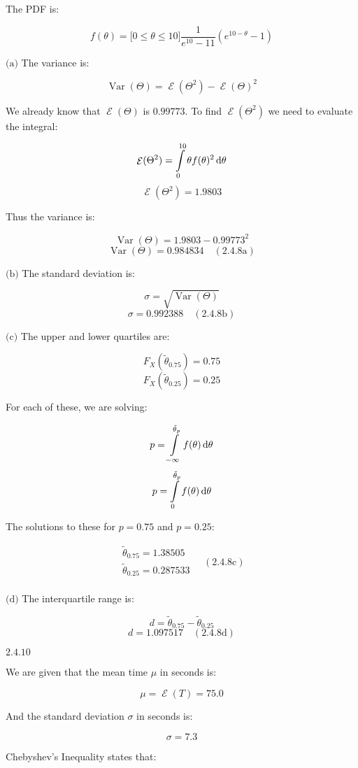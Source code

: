 \documentclass{article}
\newcommand{\problem}[2]{$\boxed{\text{#1.#2}}$}
\newcommand{\subproblem}[3]{$\boxed{\text{(#3)}}$}
\newcommand{\subsolution}[4]{\boxed{#4\quad(\text{#1.#2#3})}}
\renewcommand{\d}[1]{\,\textnormal{d}#1}
\DeclareMathOperator{\var}{Var}
\DeclareMathOperator{\E}{\mathcal{E}}
\begin{document}
The PDF is:

\[
f(\theta)=\lbrack0\le\theta\le10\rbrack \frac{1}{e^{10}-11}\left(e^{10-\theta}-1\right)
\]

%
\subproblem{2.4}{8}{a} The variance is:

\[
\var(\Theta)=\E(\Theta^2)-\E(\Theta)^2
\]

We already know that $\E(\Theta)$ is $0.99773$. To find $\E(\Theta^2)$
we need to evaluate the integral:

\[
\E(\Theta^2)=\int\limits_{0}^{10} \theta f(\theta)^2 \d{\theta}
\] \[
\E(\Theta^2)=1.9803
\]

Thus the variance is:

\[
\var(\Theta)=1.9803-0.99773^2
\] \[
\subsolution{2.4}{8}{a}{\var(\Theta)=0.984834}
\]

%
\subproblem{2.4}{8}{b} The standard deviation is:

\[
\sigma=\sqrt{\var(\Theta)}
\] \[
\subsolution{2.4}{8}{b}{\sigma=0.992388}
\]

%
\subproblem{2.4}{8}{c} The upper and lower quartiles are:

\[
F_X(\tilde{\theta}_{0.75})=0.75
\] \[
F_X(\tilde{\theta}_{0.25})=0.25
\]

For each of these, we are solving:

\[
p=\int\limits_{-\infty}^{\tilde{\theta}_p} f(\theta)\d{\theta}
\] \[
p=\int\limits_{0}^{\tilde{\theta}_p} f(\theta)\d{\theta}
\]

The solutions to these for $p=0.75$ and $p=0.25$:

\[
\subsolution{2.4}{8}{c}{\begin{array}{l}
\tilde{\theta}_{0.75}=1.38505 \\
\tilde{\theta}_{0.25}=0.287533 \\
\end{array}}
\]

%
\subproblem{2.4}{8}{d} The interquartile range is:

\[
d=\tilde{\theta}_{0.75}-\tilde{\theta}_{0.25}
\] \[
\subsolution{2.4}{8}{d}{d=1.097517}
\]

%
\problem{2.4}{10}

We are given that the mean time $\mu$ in seconds is:

\[
\mu=\E(T)=75.0
\]

And the standard deviation $\sigma$ in seconds is:

\[
\sigma=7.3
\]

Chebyshev's Inequality states that:
\end{document}

